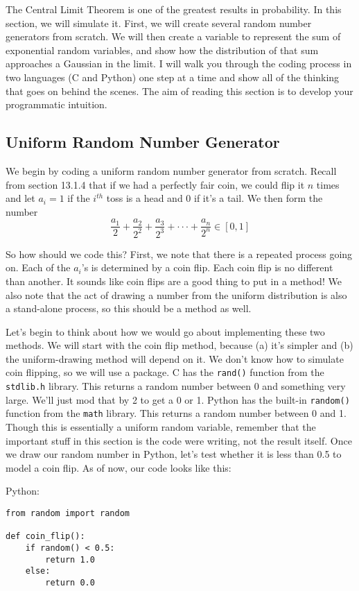 \documentclass[a4paper]{article}
\begin{document}
The Central Limit Theorem is one of the greatest results in probability. In this section, we will simulate it. First, we will create several random number generators from scratch. We will then create a variable to represent the sum of exponential random variables, and show how the distribution of that sum approaches a Gaussian in the limit. I will walk you through the coding process in two languages (C and Python) one step at a time and show all of the thinking that goes on behind the scenes. The aim of reading this section is to develop your programmatic intuition.



\subsection{Uniform Random Number Generator}
We begin by coding a uniform random number generator from scratch. Recall from section 13.1.4 that if we had a perfectly fair coin, we could flip it $n$ times and let $a_i = 1$ if the $i^{th}$ toss is a head and 0 if it's a tail. We then form the number
\[\frac{a_1}{2}+\frac{a_2}{2^2}+\frac{a_3}{2^3}+\cdot\cdot\cdot+\frac{a_n}{2^n} \in [0,1]\]

So how should we code this? First, we note that there is a repeated process going on. Each of the $a_i$'s is determined by a coin flip. Each coin flip is no different than another. It sounds like coin flips are a good thing to put in a method! We also note that the act of drawing a number from the uniform distribution is also a stand-alone process, so this should be a method as well.

Let's begin to think about how we would go about implementing these two methods. We will start with the coin flip method, because (a) it's simpler and (b) the uniform-drawing method will depend on it. We don't know how to simulate coin flipping, so we will use a package. C has the \texttt{rand()} function from the \texttt{stdlib.h} library. This returns a random number between 0 and something very large. We'll just mod that by 2 to get a 0 or 1. Python has the built-in \texttt{random()} function from the \texttt{math} library. This returns a random number between 0 and 1. Though this is essentially a uniform random variable, remember that the important stuff in this section is the code were writing, not the result itself. Once we draw our random number in Python, let's test whether it is less than 0.5 to model a coin flip. As of now, our code looks like this:

Python:
\begin{verbatim}
from random import random

def coin_flip():
    if random() < 0.5:
        return 1.0
    else:
        return 0.0
\end{verbatim}
\end{document}
